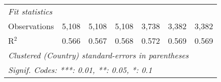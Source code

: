 \begin{tabular}{lcccccc}
   \midrule \emph{Fit statistics}\\
   Observations                                                                                  & 5,108       & 5,108         & 5,108          & 3,738          & 3,382          & 3,382\\  
   R$^2$                                                                                         & 0.566       & 0.567         & 0.568          & 0.572          & 0.569          & 0.569\\  
   \midrule
   \multicolumn{7}{l}{\emph{Clustered (Country) standard-errors in parentheses}}\\
   \multicolumn{7}{l}{\emph{Signif. Codes: ***: 0.01, **: 0.05, *: 0.1}}\\
\end{tabular}
\par\endgroup


